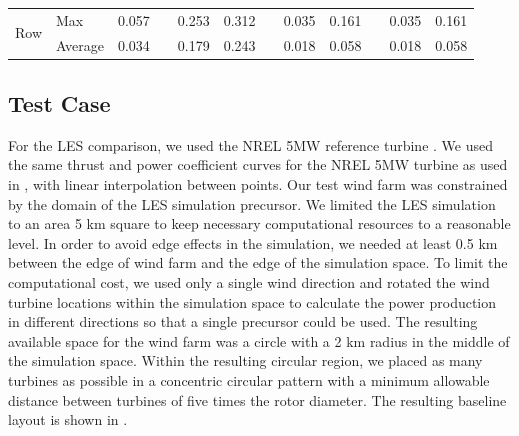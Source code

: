 \documentclass[conf]{new-aiaa}
\begin{document}
\begin{table}[htpb!]
\begin{tabular}{@{}llrcrrcrrcrr@{}}


\multicolumn{1}{c|}{\multirow{2}{*}{Row}} &  \multicolumn{1}{l}{Max} & 0.057 & & 0.253 & 0.312 & & 0.035 & 0.161 & & 0.035 & 0.161\\
\multicolumn{1}{c|}{} &  \multicolumn{1}{l}{Average} & 0.034 & & 0.179 &0.243 & & 0.018 & 0.058 & & 0.018 & 0.058 \\

 \bottomrule
\end{tabular}

\end{table}

\subsection{Test Case}\label{sec:testcase}

For the LES comparison, we used the NREL 5MW reference turbine \cite{jonkman2009definition}. We used the same thrust and power coefficient curves for the NREL 5MW turbine as used in \cite{gebraad2017-max-aep}, with linear interpolation between points. Our test wind farm was constrained by the domain of the LES simulation precursor. We limited the LES simulation to an area 5 km square to keep necessary computational resources to a reasonable level. In order to avoid edge effects in the simulation, we needed at least 0.5 km between the edge of wind farm and the edge of the simulation space. To limit the computational cost, we used only a single wind direction and rotated the wind turbine locations within the simulation space to calculate the power production in different directions so that a single precursor could be used. The resulting available space for the wind farm was a circle with a 2 km radius in the middle of the simulation space. Within the resulting circular region, we placed as many turbines as possible in a concentric circular pattern with a minimum allowable distance between turbines of five times the rotor diameter. The resulting baseline layout is shown in .    
\end{document}
